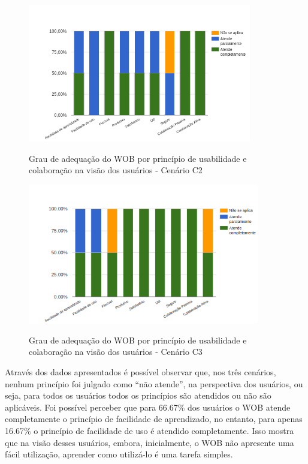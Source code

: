 \begin{figure}[!htb]
    \centering
    \caption{Grau de adequação do WOB por princípio de usabilidade e colaboração na visão dos usuários - Cenário C2}
    \includegraphics[width=0.87\textwidth]{./04-figuras/avaliacao-cenario2}
    \label{fig:avaliacao-cenario2}
\end{figure} 

\begin{figure}[!htb]
    \centering
    \caption{Grau de adequação do WOB por princípio de usabilidade e colaboração na visão dos usuários - Cenário C3}
    \includegraphics[width=0.9\textwidth]{./04-figuras/avaliacao-cenario3}
    \label{fig:avaliacao-cenario3}
\end{figure}


Através dos dados apresentados é possível observar que, nos três cenários, nenhum princípio 
foi julgado como “não atende”, na perspectiva dos usuários, ou seja, para todos os usuários 
todos os princípios são atendidos ou não são aplicáveis. Foi possível perceber que para 
66.67\% dos usuários o WOB atende completamente o princípio de facilidade de aprendizado, no 
entanto, para apenas 16.67\% o princípio de facilidade de uso é atendido completamente. Isso 
mostra que na visão desses usuários, embora, inicialmente, o WOB não apresente uma fácil 
utilização, aprender como utilizá-lo é uma tarefa simples. 

